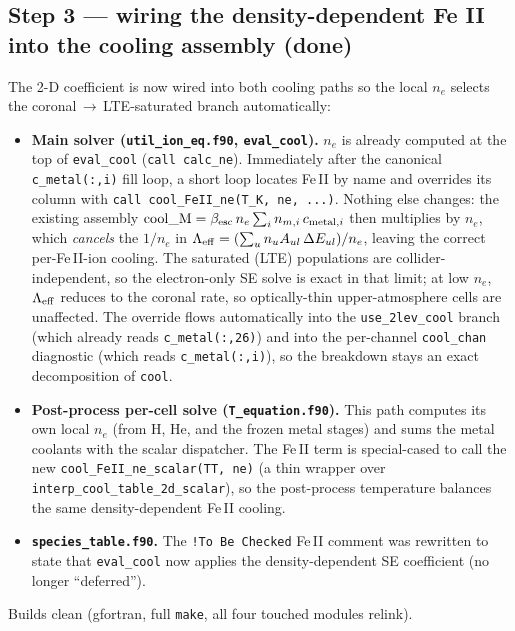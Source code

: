 \documentclass[english,a4paper]{kiseon_memo}
\begin{document}
\subsection{Step 3 --- wiring the density-dependent Fe II into the cooling assembly (done)}
The 2-D coefficient is now wired into both cooling paths so the local \(n_e\)
selects the coronal\,\(\rightarrow\)\,LTE-saturated branch automatically:
\begin{itemize}
  \item \textbf{Main solver (\texttt{util\_ion\_eq.f90}, \texttt{eval\_cool}).}
    \(n_e\) is already computed at the top of \texttt{eval\_cool}
    (\verb|call calc_ne|). Immediately after the canonical \verb|c_metal(:,i)|
    fill loop, a short loop locates Fe\,II by name and overrides its column with
    \verb|call cool_FeII_ne(T_K, ne, ...)|. Nothing else changes: the existing
    assembly \(\mathrm{cool\_M} = \beta_{\rm esc}\,n_e \sum_i n_{m,i}\,c_{{\rm
    metal},i}\) then multiplies by \(n_e\), which \emph{cancels} the \(1/n_e\)
    in \(\Lambda_{\rm eff} = (\sum_u n_u A_{ul}\,\Delta E_{ul})/n_e\), leaving the
    correct per-Fe\,II-ion cooling. The saturated (LTE) populations are
    collider-independent, so the electron-only SE solve is exact in that limit;
    at low \(n_e\), \(\Lambda_{\rm eff}\) reduces to the coronal rate, so
    optically-thin upper-atmosphere cells are unaffected. The override flows
    automatically into the \verb|use_2lev_cool| branch (which already reads
    \verb|c_metal(:,26)|) and into the per-channel \verb|cool_chan| diagnostic
    (which reads \verb|c_metal(:,i)|), so the breakdown stays an exact
    decomposition of \verb|cool|.
  \item \textbf{Post-process per-cell solve (\texttt{T\_equation.f90}).} This path
    computes its own local \(n_e\) (from H, He, and the frozen metal stages) and
    sums the metal coolants with the scalar dispatcher. The Fe\,II term is
    special-cased to call the new \verb|cool_FeII_ne_scalar(TT, ne)| (a thin
    wrapper over \verb|interp_cool_table_2d_scalar|), so the post-process
    temperature balances the same density-dependent Fe\,II cooling.
  \item \textbf{\texttt{species\_table.f90}.} The \verb|!To Be Checked| Fe\,II
    comment was rewritten to state that \texttt{eval\_cool} now applies the
    density-dependent SE coefficient (no longer ``deferred'').
\end{itemize}
Builds clean (gfortran, full \texttt{make}, all four touched modules relink).
\end{document}
